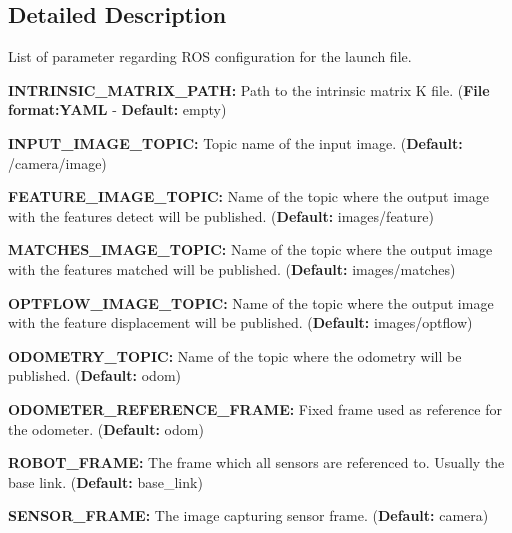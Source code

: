 \subsection{\-Detailed \-Description}
\-List of parameter regarding \-R\-O\-S configuration for the launch file.
\begin{DoxyItemize}
\item {\bfseries \-I\-N\-T\-R\-I\-N\-S\-I\-C\-\_\-\-M\-A\-T\-R\-I\-X\-\_\-\-P\-A\-T\-H\-:} \-Path to the intrinsic matrix \-K file. ({\bfseries \-File} {\bfseries format\-:\-Y\-A\-M\-L} -\/ {\bfseries \-Default\-:} empty)
\item {\bfseries \-I\-N\-P\-U\-T\-\_\-\-I\-M\-A\-G\-E\-\_\-\-T\-O\-P\-I\-C\-:} \-Topic name of the input image. ({\bfseries \-Default\-:} /camera/image)
\item {\bfseries \-F\-E\-A\-T\-U\-R\-E\-\_\-\-I\-M\-A\-G\-E\-\_\-\-T\-O\-P\-I\-C\-:} \-Name of the topic where the output image with the features detect will be published. ({\bfseries \-Default\-:} images/feature)
\item {\bfseries \-M\-A\-T\-C\-H\-E\-S\-\_\-\-I\-M\-A\-G\-E\-\_\-\-T\-O\-P\-I\-C\-:} \-Name of the topic where the output image with the features matched will be published. ({\bfseries \-Default\-:} images/matches)
\item {\bfseries \-O\-P\-T\-F\-L\-O\-W\-\_\-\-I\-M\-A\-G\-E\-\_\-\-T\-O\-P\-I\-C\-:} \-Name of the topic where the output image with the feature displacement will be published. ({\bfseries \-Default\-:} images/optflow)
\item {\bfseries \-O\-D\-O\-M\-E\-T\-R\-Y\-\_\-\-T\-O\-P\-I\-C\-:} \-Name of the topic where the odometry will be published. ({\bfseries \-Default\-:} odom)
\item {\bfseries \-O\-D\-O\-M\-E\-T\-E\-R\-\_\-\-R\-E\-F\-E\-R\-E\-N\-C\-E\-\_\-\-F\-R\-A\-M\-E\-:} \-Fixed frame used as reference for the odometer. ({\bfseries \-Default\-:} odom)
\item {\bfseries \-R\-O\-B\-O\-T\-\_\-\-F\-R\-A\-M\-E\-:} \-The frame which all sensors are referenced to. \-Usually the base link. ({\bfseries \-Default\-:} base\-\_\-link)
\item {\bfseries \-S\-E\-N\-S\-O\-R\-\_\-\-F\-R\-A\-M\-E\-:} \-The image capturing sensor frame. ({\bfseries \-Default\-:} camera) 
\end{DoxyItemize}

